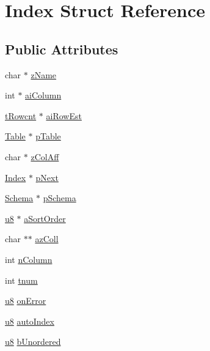 \hypertarget{struct_index}{\section{Index Struct Reference}
\label{struct_index}
}
\subsection*{Public Attributes}
\begin{DoxyCompactItemize}
\item 
char $\ast$ \hyperlink{struct_index_a8848cddf6e09f22e3b794ec019082ced}{z\-Name}
\item 
int $\ast$ \hyperlink{struct_index_acbb125339b02ca6819dd2e382de2d639}{ai\-Column}
\item 
\hyperlink{sqlite3_8c_a6de101211e945e499510b624a65c28a4}{t\-Rowcnt} $\ast$ \hyperlink{struct_index_aa408555f4da96ca1fae741ff6d33a3bf}{ai\-Row\-Est}
\item 
\hyperlink{struct_table}{Table} $\ast$ \hyperlink{struct_index_a01c6d4da27cba325ca58f333f87a6f44}{p\-Table}
\item 
char $\ast$ \hyperlink{struct_index_af076df9f74dd836001c0a59d27274c0e}{z\-Col\-Aff}
\item 
\hyperlink{struct_index}{Index} $\ast$ \hyperlink{struct_index_a115a17d236bd277d59dd5ea030954c3e}{p\-Next}
\item 
\hyperlink{struct_schema}{Schema} $\ast$ \hyperlink{struct_index_af14f5ddd57eab2aba63dcb5db2aa92af}{p\-Schema}
\item 
\hyperlink{sqlite3_8c_a74a0f6424ae628af25f23f0a35f6ead3}{u8} $\ast$ \hyperlink{struct_index_a0a3fc87b53193995f59c9657443e9a99}{a\-Sort\-Order}
\item 
char $\ast$$\ast$ \hyperlink{struct_index_ab690ebb96c0329896b0fe2ab56813b88}{az\-Coll}
\item 
int \hyperlink{struct_index_ac583449830c285a52d1fd10b8c890162}{n\-Column}
\item 
int \hyperlink{struct_index_af895a09c01701021c3e36362c04a1ae6}{tnum}
\item 
\hyperlink{sqlite3_8c_a74a0f6424ae628af25f23f0a35f6ead3}{u8} \hyperlink{struct_index_ae8bf87d0414e5c46b86192cfbdd271a7}{on\-Error}
\item 
\hyperlink{sqlite3_8c_a74a0f6424ae628af25f23f0a35f6ead3}{u8} \hyperlink{struct_index_a1fa09182749b6e07b2555d5b3dffb91d}{auto\-Index}
\item 
\hyperlink{sqlite3_8c_a74a0f6424ae628af25f23f0a35f6ead3}{u8} \hyperlink{struct_index_a1a3114080bcca1d9dd23ce5755d4e4e8}{b\-Unordered}
\end{DoxyCompactItemize}



